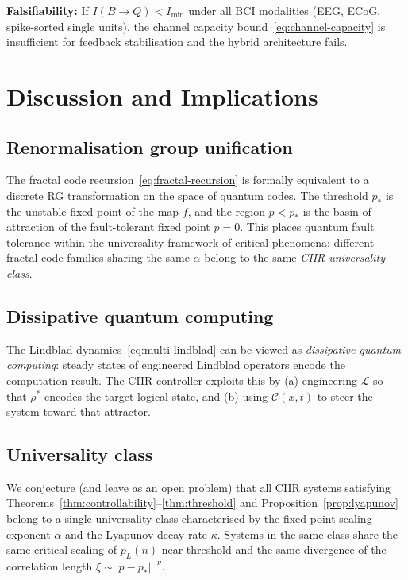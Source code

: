 \textbf{Falsifiability:} If $I(B \to Q) < I_{\mathrm{min}}$ under
all BCI modalities (EEG, ECoG, spike-sorted single units), the
channel capacity bound~\eqref{eq:channel-capacity} is insufficient
for feedback stabilisation and the hybrid architecture fails.

\section{Discussion and Implications}
\label{sec:ch21-discussion}

\subsection{Renormalisation group unification}

The fractal code recursion~\eqref{eq:fractal-recursion} is formally
equivalent to a discrete RG transformation on the space of quantum
codes.  The threshold $p_*$ is the unstable fixed point of the map $f$,
and the region $p < p_*$ is the basin of attraction of the fault-tolerant
fixed point $p = 0$.  This places quantum fault tolerance within the
universality framework of critical phenomena: different fractal code
families sharing the same $\alpha$ belong to the same \emph{CIIR
universality class}.

\subsection{Dissipative quantum computing}

The Lindblad dynamics~\eqref{eq:multi-lindblad} can be viewed as
\emph{dissipative quantum computing}: steady states of engineered
Lindblad operators encode the computation result.  The CIIR controller
exploits this by (a) engineering $\mathcal{L}$ so that $\rho^*$ encodes
the target logical state, and (b) using $\mathcal{C}(x,t)$ to steer
the system toward that attractor.

\subsection{Universality class}

We conjecture (and leave as an open problem) that all CIIR systems
satisfying Theorems~\ref{thm:controllability}--\ref{thm:threshold} and
Proposition~\ref{prop:lyapunov} belong to a single universality class
characterised by the fixed-point scaling exponent $\alpha$ and the
Lyapunov decay rate $\kappa$.  Systems in the same class share the same
critical scaling of $p_L(n)$ near threshold and the same divergence of
the correlation length $\xi \sim |p - p_*|^{-\nu}$.

